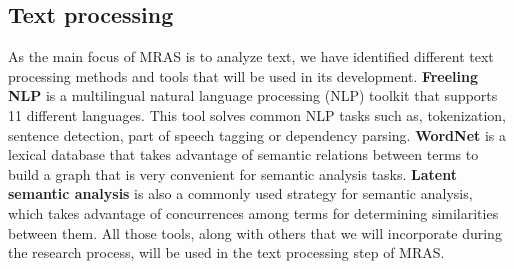 \documentclass{bsu-ms}
\begin{document}
\subsection{Text processing}
As the main focus of MRAS is to analyze text, we have identified different text processing methods and tools that will be used in its development. \textbf{Freeling NLP} \cite{padro12,padro10b} is a multilingual natural language processing (NLP) toolkit that supports 11 different languages. This tool solves common NLP tasks such as, tokenization, sentence detection, part of speech tagging or dependency parsing. \textbf{WordNet} is a lexical database that takes advantage of semantic relations between terms to build a graph that is very convenient for semantic analysis tasks. \textbf{Latent semantic analysis} is also a commonly used strategy  for semantic analysis, which takes advantage of concurrences among terms for determining similarities between them. All those tools, along with others that we will incorporate during the research process, will be used in the text processing step of MRAS.




\end{document}
